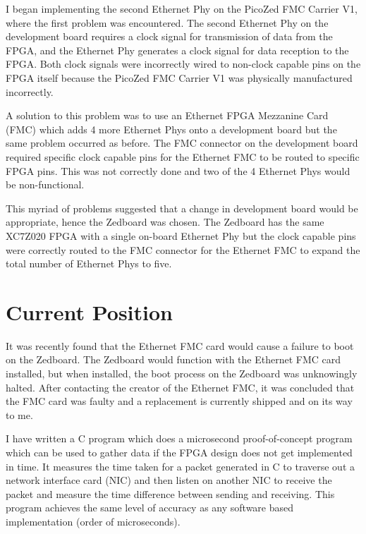 \par I began implementing the second Ethernet Phy on the PicoZed FMC Carrier V1, where the first
problem was encountered. The second Ethernet Phy on the development board requires a clock
signal for transmission of data from the FPGA, and the Ethernet Phy generates a clock signal for data
reception to the FPGA. Both clock signals were incorrectly wired to non-clock capable pins on the
FPGA itself because the PicoZed FMC Carrier V1 was physically manufactured incorrectly.

\par A solution to this problem was to use an Ethernet FPGA Mezzanine Card (FMC) which adds 4 more
Ethernet Phys onto a development board but the same problem occurred as before. The FMC
connector on the development board required specific clock capable pins for the Ethernet FMC to be
routed to specific FPGA pins. This was not correctly done and two of the 4 Ethernet Phys would be
non-functional.

\par This myriad of problems suggested that a change in development board would be appropriate,
hence the Zedboard was chosen. The Zedboard has the same XC7Z020 FPGA with a single on-board
Ethernet Phy but the clock capable pins were correctly routed to the FMC connector for the Ethernet
FMC to expand the total number of Ethernet Phys to five.

\section{Current Position}

\par It was recently found that the Ethernet FMC card would cause a failure to boot on the Zedboard. The
Zedboard would function with the Ethernet FMC card installed, but when installed, the boot process
on the Zedboard was unknowingly halted. After contacting the creator of the Ethernet FMC, it was
concluded that the FMC card was faulty and a replacement is currently shipped and on its way to me.

\par I have written a C program which does a microsecond proof-of-concept program which can be used
to gather data if the FPGA design does not get implemented in time. It measures the time taken for a
packet generated in C to traverse out a network interface card (NIC) and then listen on another NIC
to receive the packet and measure the time difference between sending and receiving. This program
achieves the same level of accuracy as any software based implementation (order of microseconds).
